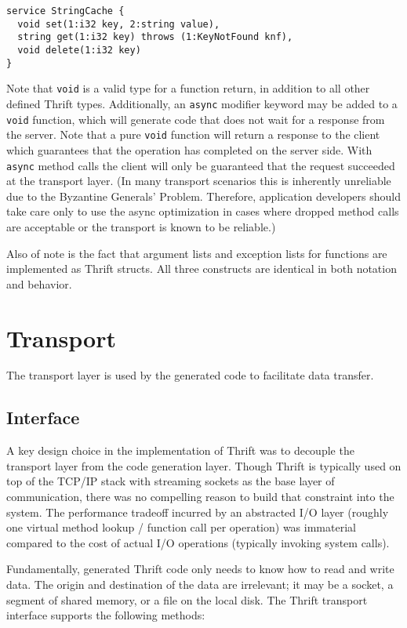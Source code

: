\documentclass[nocopyrightspace,blockstyle]{sigplanconf}
\begin{document}
\begin{verbatim}
service StringCache {
  void set(1:i32 key, 2:string value),
  string get(1:i32 key) throws (1:KeyNotFound knf),
  void delete(1:i32 key)
}
\end{verbatim}

Note that \texttt{void} is a valid type for a function return, in addition to
all other defined Thrift types. Additionally, an \texttt{async} modifier
keyword may be added to a \texttt{void} function, which will generate code that does
not wait for a response from the server. Note that a pure \texttt{void}
function will return a response to the client which guarantees that the
operation has completed on the server side. With \texttt{async} method calls
the client will only be guaranteed that the request succeeded at the
transport layer. (In many transport scenarios this is inherently unreliable
due to the Byzantine Generals' Problem. Therefore, application developers
should take care only to use the async optimization in cases where dropped
method calls are acceptable or the transport is known to be reliable.)

Also of note is the fact that argument lists and exception lists for functions
are implemented as Thrift structs. All three constructs are identical in both
notation and behavior.

\section{Transport}

The transport layer is used by the generated code to facilitate data transfer.

\subsection{Interface}

A key design choice in the implementation of Thrift was to decouple the
transport layer from the code generation layer. Though Thrift is typically
used on top of the TCP/IP stack with streaming sockets as the base layer of
communication, there was no compelling reason to build that constraint into
the system. The performance tradeoff incurred by an abstracted I/O layer
(roughly one virtual method lookup / function call per operation) was
immaterial compared to the cost of actual I/O operations (typically invoking
system calls).

Fundamentally, generated Thrift code only needs to know how to read and
write data. The origin and destination of the data are irrelevant; it may be a
socket, a segment of shared memory, or a file on the local disk. The Thrift
transport interface supports the following methods:
\end{document}
